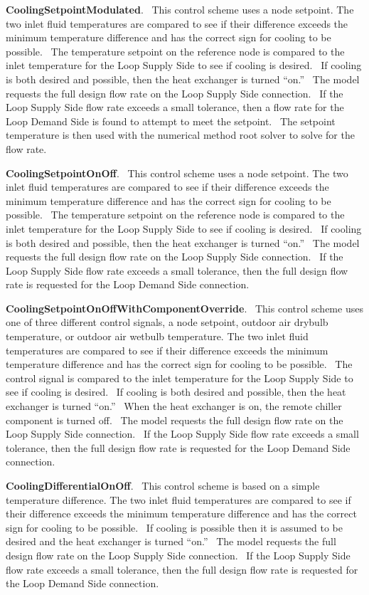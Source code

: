 \textbf{CoolingSetpointModulated}.~ This control scheme uses a node setpoint. The two inlet fluid temperatures are compared to see if their difference exceeds the minimum temperature difference and has the correct sign for cooling to be possible.~ The temperature setpoint on the reference node is compared to the inlet temperature for the Loop Supply Side to see if cooling is desired.~ If cooling is both desired and possible, then the heat exchanger is turned ``on.''~ The model requests the full design flow rate on the Loop Supply Side connection.~ If the Loop Supply Side flow rate exceeds a small tolerance, then a flow rate for the Loop Demand Side is found to attempt to meet the setpoint.~ The setpoint temperature is then used with the numerical method root solver to solve for the flow rate.

\textbf{CoolingSetpointOnOff}.~ This control scheme uses a node setpoint. The two inlet fluid temperatures are compared to see if their difference exceeds the minimum temperature difference and has the correct sign for cooling to be possible.~ The temperature setpoint on the reference node is compared to the inlet temperature for the Loop Supply Side to see if cooling is desired.~ If cooling is both desired and possible, then the heat exchanger is turned ``on.''~ The model requests the full design flow rate on the Loop Supply Side connection.~ If the Loop Supply Side flow rate exceeds a small tolerance, then the full design flow rate is requested for the Loop Demand Side connection.

\textbf{CoolingSetpointOnOffWithComponentOverride}.~ This control scheme uses one of three different control signals, a node setpoint, outdoor air drybulb temperature, or outdoor air wetbulb temperature. The two inlet fluid temperatures are compared to see if their difference exceeds the minimum temperature difference and has the correct sign for cooling to be possible.~ The control signal is compared to the inlet temperature for the Loop Supply Side to see if cooling is desired.~ If cooling is both desired and possible, then the heat exchanger is turned ``on.''~ When the heat exchanger is on, the remote chiller component is turned off.~ The model requests the full design flow rate on the Loop Supply Side connection.~ If the Loop Supply Side flow rate exceeds a small tolerance, then the full design flow rate is requested for the Loop Demand Side connection.

\textbf{CoolingDifferentialOnOff}.~ This control scheme is based on a simple temperature difference. The two inlet fluid temperatures are compared to see if their difference exceeds the minimum temperature difference and has the correct sign for cooling to be possible.~ If cooling is possible then it is assumed to be desired and the heat exchanger is turned ``on.''~ The model requests the full design flow rate on the Loop Supply Side connection.~ If the Loop Supply Side flow rate exceeds a small tolerance, then the full design flow rate is requested for the Loop Demand Side connection.

